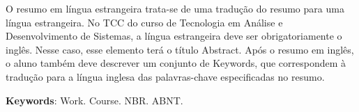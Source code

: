 %
%

\begin{ABSTRACT}
	
		\noindent O resumo em língua estrangeira trata-se de uma tradução do resumo para uma língua estrangeira. No TCC do curso de Tecnologia em Análise e Desenvolvimento de Sistemas, a língua estrangeira deve ser obrigatoriamente o inglês. Nesse caso, esse elemento terá o título Abstract. Após o resumo em inglês, o aluno também deve descrever um conjunto de Keywords, que correspondem à tradução para a língua inglesa das palavras-chave especificadas no resumo.


		\vspace*{0.5cm}\noindent\textbf{Keywords}: Work. Course. NBR. ABNT.
		
\end{ABSTRACT}
